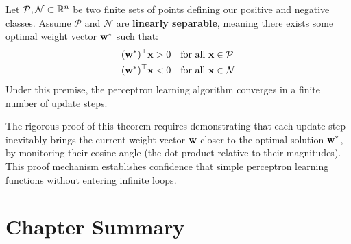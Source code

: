 \begin{theorembox}
Let $\mathcal{P}, \mathcal{N} \subset \mathbb{R}^n$ be two finite sets of points defining our positive and negative classes. Assume $\mathcal{P}$ and $\mathcal{N}$ are \textbf{linearly separable}, meaning there exists some optimal weight vector $\mathbf{w}^*$ such that:
\begin{align*}
    (\mathbf{w}^*)^\top \mathbf{x} &> 0 \quad \text{for all } \mathbf{x} \in \mathcal{P} \\
    (\mathbf{w}^*)^\top \mathbf{x} &< 0 \quad \text{for all } \mathbf{x} \in \mathcal{N}
\end{align*}
Under this premise, the perceptron learning algorithm converges in a finite number of update steps.
\end{theorembox}

The rigorous proof of this theorem requires demonstrating that each update step inevitably brings the current weight vector $\mathbf{w}$ closer to the optimal solution $\mathbf{w}^*$, by monitoring their cosine angle (the dot product relative to their magnitudes). This proof mechanism establishes confidence that simple perceptron learning functions without entering infinite loops.


\section{Chapter Summary}

